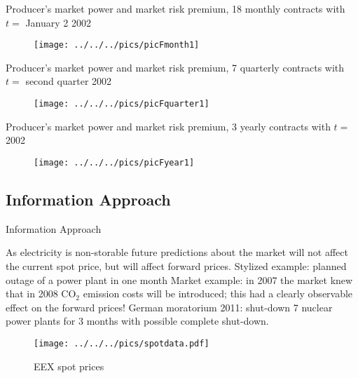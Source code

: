 {Producer's market power and market risk
premium, 18 monthly contracts with $t=$ January 2 2002}

\begin{figure}[htbp]
\texttt{[image: ../../../pics/picFmonth1]}
\end{figure}


{Producer's market power and market risk premium, 7 quarterly contracts with $t=$ second quarter 2002}

\begin{figure}
\texttt{[image: ../../../pics/picFquarter1]}
\end{figure}

{Producer's market power and market risk premium, 3 yearly contracts with $t=$ 2002}


\begin{figure}[htbp]
\texttt{[image: ../../../pics/picFyear1]}
\end{figure}


\subsection{Information Approach}


{Information Approach}

 As electricity is non-storable future predictions about the market will not affect the current spot price, but will affect forward prices.
 Stylized example: planned outage of a power plant in one month
 Market example: in 2007 the market knew that in 2008 CO$_2$ emission costs will be introduced; this had a clearly observable effect on the forward prices!
 German moratorium 2011: shut-down 7 nuclear power plants for 3 months with possible complete shut-down.



\begin{figure}[htbp]
  \texttt{[image: ../../../pics/spotdata.pdf]}
    \caption{EEX spot prices}
\end{figure}




